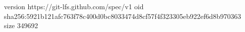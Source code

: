 version https://git-lfs.github.com/spec/v1
oid sha256:5921b121afc763f78c400d0bc8033474d8cf57f4f323305eb922ef6d8b970363
size 349692
